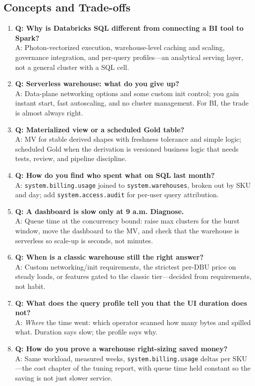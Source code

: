 \subsection{Concepts and Trade-offs}
\begin{enumerate}
    \item \textbf{Q: Why is Databricks SQL different from connecting a BI tool to Spark?}\\
    A: Photon-vectorized execution, warehouse-level caching and scaling, governance integration, and per-query profiles---an analytical serving layer, not a general cluster with a SQL cell.
    \item \textbf{Q: Serverless warehouse: what do you give up?}\\
    A: Data-plane networking options and some custom init control; you gain instant start, fast autoscaling, and no cluster management. For BI, the trade is almost always right.
    \item \textbf{Q: Materialized view or a scheduled Gold table?}\\
    A: MV for stable derived shapes with freshness tolerance and simple logic; scheduled Gold when the derivation is versioned business logic that needs tests, review, and pipeline discipline.
    \item \textbf{Q: How do you find who spent what on SQL last month?}\\
    A: \texttt{system.billing.usage} joined to \texttt{system.warehouses}, broken out by SKU and day; add \texttt{system.access.audit} for per-user query attribution.
    \item \textbf{Q: A dashboard is slow only at 9 a.m. Diagnose.}\\
    A: Queue time at the concurrency bound: raise max clusters for the burst window, move the dashboard to the MV, and check that the warehouse is serverless so scale-up is seconds, not minutes.
    \item \textbf{Q: When is a classic warehouse still the right answer?}\\
    A: Custom networking/init requirements, the strictest per-DBU price on steady loads, or features gated to the classic tier---decided from requirements, not habit.
    \item \textbf{Q: What does the query profile tell you that the UI duration does not?}\\
    A: \emph{Where} the time went: which operator scanned how many bytes and spilled what. Duration says slow; the profile says why.
    \item \textbf{Q: How do you prove a warehouse right-sizing saved money?}\\
    A: Same workload, measured weeks, \texttt{system.billing.usage} deltas per SKU---the cost chapter of the tuning report, with queue time held constant so the saving is not just slower service.
\end{enumerate}

